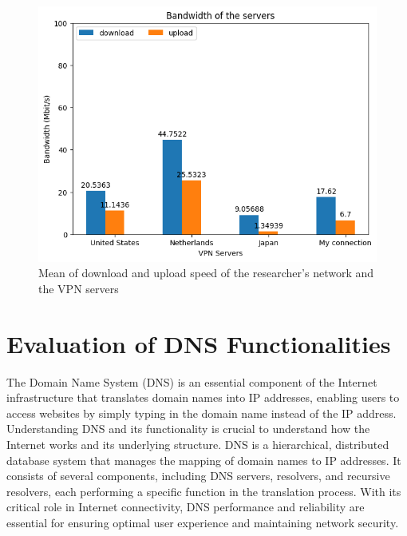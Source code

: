 \documentclass[eng]{class}
\begin{document}
\begin{figure}[H]
    \centering
    \includegraphics[width=.7\columnwidth]{images/ServerBandwidth.png}
    \caption{Mean of download and upload speed of the researcher's network and the VPN servers}
    \label{fig-4}
\end{figure}
\section{Evaluation of DNS Functionalities}
The Domain Name System (DNS) is an essential component of the Internet infrastructure that translates domain names into IP addresses,
enabling users to access websites by simply typing in the domain name instead of the IP address.
Understanding DNS and its functionality is crucial to understand how the Internet works and its underlying structure.
DNS is a hierarchical, distributed database system that manages the mapping of domain names to IP addresses.
It consists of several components, including DNS servers, resolvers, and recursive resolvers, each performing a specific function in the translation process.
With its critical role in Internet connectivity, DNS performance and reliability are essential for ensuring optimal user experience and maintaining network security.
\end{document}
